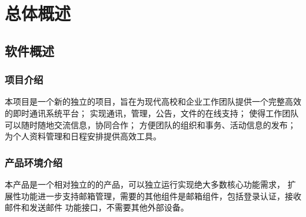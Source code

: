 \chapter{总体概述}
\section{软件概述}

	\subsection{项目介绍}
	本项目是一个新的独立的项目，旨在为现代高校和企业工作团队提供一个完整高效的即时通讯系统平台；
	实现通讯，管理，公告，文件的在线支持；
	使得工作团队可以随时随地交流信息，协同合作；
	方便团队的组织和事务、活动信息的发布；
	为个人资料管理和日程安排提供高效工具。

	\subsection{产品环境介绍}
	本产品是一个相对独立的的产品，可以独立运行实现绝大多数核心功能需求，
	扩展性功能进一步支持邮箱管理，需要的其他组件是邮箱组件，包括登录认证，接收邮件和发送邮件
	功能接口，不需要其他外部设备。
\newpage
